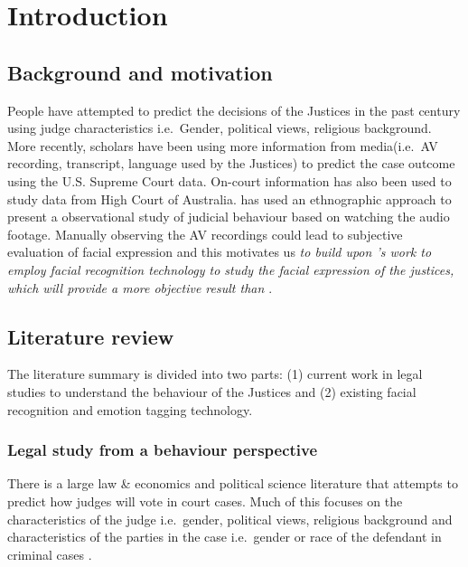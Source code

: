\documentclass{monashthesis}
\begin{document}
\clearpage{}\setcounter{page}{1}

\hypertarget{ch:intro}{%
\chapter{Introduction}\label{ch:intro}}

\hypertarget{background-and-motivation}{%
\section{Background and motivation}\label{background-and-motivation}}

People have attempted to predict the decisions of the Justices in the past century using judge characteristics i.e.~Gender, political views, religious background. More recently, scholars\autocites{Shullman2004illusion}{chen2018justice} have been using more information from media(i.e.~AV recording, transcript, language used by the Justices) to predict the case outcome using the U.S. Supreme Court data. On-court information has also been used to study data from High Court of Australia. \textcite{tutton2018judicial} has used an ethnographic approach to present a observational study of judicial behaviour based on watching the audio footage. Manually observing the AV recordings could lead to subjective evaluation of facial expression and this motivates us \emph{to build upon \textcite{tutton2018judicial}'s work to employ facial recognition technology to study the facial expression of the justices, which will provide a more objective result than \textcite{tutton2018judicial}}.

\hypertarget{literature-review}{%
\section{Literature review}\label{literature-review}}

The literature summary is divided into two parts: (1) current work in legal studies to understand the behaviour of the Justices and (2) existing facial recognition and emotion tagging technology.

\hypertarget{legal-study-from-a-behaviour-perspective}{%
\subsection{Legal study from a behaviour perspective}\label{legal-study-from-a-behaviour-perspective}}

There is a large law \& economics and political science literature that attempts to predict how judges will vote in court cases. Much of this focuses on the characteristics of the judge i.e.~gender, political views, religious background and characteristics of the parties in the case i.e.~gender or race of the defendant in criminal cases \autocites{Stuart1962}{Peter1984}{Combining1987}{Susan1988}{Steffensmeier2001}{Kulik2003}.
\end{document}
